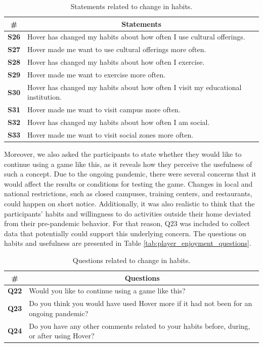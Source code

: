\begin{table}[H]
    \centering
    \begin{tabularx}{\textwidth}{|c|X|}
        \hline
        \textbf{\#} & \multicolumn{1}{c|}{\textbf{Statements}} \\ \hline
        \textbf{S26} & Hover has changed my habits about how often I use cultural offerings. \\
        \textbf{S27} & Hover made me want to use cultural offerings more often.\\
        \textbf{S28} & Hover has changed my habits about how often I exercise. \\
        \textbf{S29} & Hover made me want to exercise more often. \\ 
        \textbf{S30} & Hover has changed my habits about how often I visit my educational institution. \\
        \textbf{S31} & Hover made me want to visit campus more often. \\
        \textbf{S32} & Hover has changed my habits about how often I am social. \\ 
        \textbf{S33} &  Hover made me want to visit social zones more often.\\ \hline
    \end{tabularx}
    \caption{Statements related to change in habits.}
    \label{tab:player_habits_statements}
\end{table}

Moreover, we also asked the participants to state whether they would like to continue using a game like this, as it reveals how they perceive the usefulness of such a concept. Due to the ongoing pandemic, there were several concerns that it would affect the results or conditions for testing the game. Changes in local and national restrictions, such as closed campuses, training centers, and restaurants, could happen on short notice. Additionally, it was also realistic to think that the participants' habits and willingness to do activities outside their home deviated from their pre-pandemic behavior. For that reason, Q23 was included to collect data that potentially could support this underlying concern. The questions on habits and usefulness are presented in Table \ref{tab:player_enjoyment_questions}.

\begin{table}[H]
    \centering
    \begin{tabularx}{\textwidth}{|c|X|}
        \hline
        \textbf{\#} & \multicolumn{1}{c|}{\textbf{Questions}} \\ \hline
        \textbf{Q22} & Would you like to continue using a game like this?  \\
        \textbf{Q23} & Do you think you would have used Hover more if it had not been for an ongoing pandemic? \\
        \textbf{Q24} & Do you have any other comments related to your habits before, during, or after using Hover? \\ \hline
    \end{tabularx}
    \caption{Questions related to change in habits.}
    \label{tab:player_habits_questions}
\end{table}

